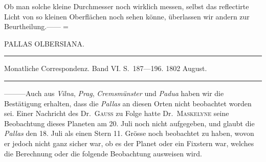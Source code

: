 Ob man solche kleine Durchmesser noch wirklich messen, selbst das reflectirte Licht von so kleinen Oberflächen noch sehen könne, überlassen wir andern zur Beurtheilung.\quad —\quad —\quad $=$
\begin{flushright}\end{flushright}
%
\bigskip{}
\begin{center}
PALLAS OLBERSIANA.\par
\medskip\hrule\medskip
Monatliche Correspondenz. Band VI. S.\ 187—196. 1802 August.\par
\medskip\hrule
\end{center}\medskip
—\quad —\quad —\quad Auch aus \textit{Vilna}, \textit{Prag}, \textit{Cremsmünster} und \textit{Padua} haben wir die Bestätigung erhalten, dass die \textit{Pallas} an diesen Orten nicht beobachtet worden sei. Einer Nachricht des Dr.\ \textsc{Gauss} zu Folge hatte Dr.\ \textsc{Maskelyne} seine Beobachtung dieses Planeten am 20. Juli noch nicht aufgegeben, und glaubt die \textit{Pallas} den 18. Juli als einen Stern 11. Grösse noch beobachtet zu haben, wovon er jedoch nicht ganz sicher war, ob es der Planet oder ein Fixstern war, welches die Berechnung oder die folgende Beobachtung ausweisen wird.


